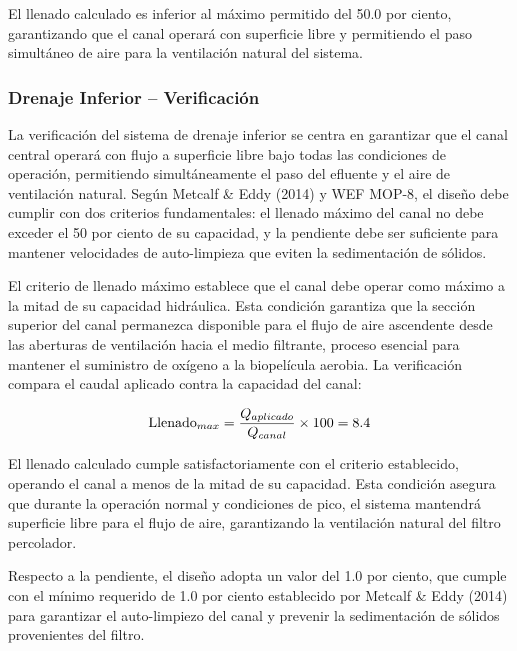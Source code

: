 \documentclass[12pt,a4paper]{article}
\begin{document}
El llenado calculado es inferior al máximo permitido del 50.0 por ciento, garantizando que el canal operará con superficie libre y permitiendo el paso simultáneo de aire para la ventilación natural del sistema.

\subsubsection{Drenaje Inferior -- Verificación}

La verificación del sistema de drenaje inferior se centra en garantizar que el canal central operará con flujo a superficie libre bajo todas las condiciones de operación, permitiendo simultáneamente el paso del efluente y el aire de ventilación natural. Según Metcalf \& Eddy (2014) y WEF MOP-8, el diseño debe cumplir con dos criterios fundamentales: el llenado máximo del canal no debe exceder el 50 por ciento de su capacidad, y la pendiente debe ser suficiente para mantener velocidades de auto-limpieza que eviten la sedimentación de sólidos.

El criterio de llenado máximo establece que el canal debe operar como máximo a la mitad de su capacidad hidráulica. Esta condición garantiza que la sección superior del canal permanezca disponible para el flujo de aire ascendente desde las aberturas de ventilación hacia el medio filtrante, proceso esencial para mantener el suministro de oxígeno a la biopelícula aerobia. La verificación compara el caudal aplicado contra la capacidad del canal:

\begin{equation}
\text{Llenado}_{max} = \frac{Q_{aplicado}}{Q_{canal}} \times 100 = 8.4 \\%
\end{equation}

El llenado calculado cumple satisfactoriamente con el criterio establecido, operando el canal a menos de la mitad de su capacidad. Esta condición asegura que durante la operación normal y condiciones de pico, el sistema mantendrá superficie libre para el flujo de aire, garantizando la ventilación natural del filtro percolador.

Respecto a la pendiente, el diseño adopta un valor del 1.0 por ciento, que cumple con el mínimo requerido de 1.0 por ciento establecido por Metcalf \& Eddy (2014) para garantizar el auto-limpiezo del canal y prevenir la sedimentación de sólidos provenientes del filtro.
\end{document}
